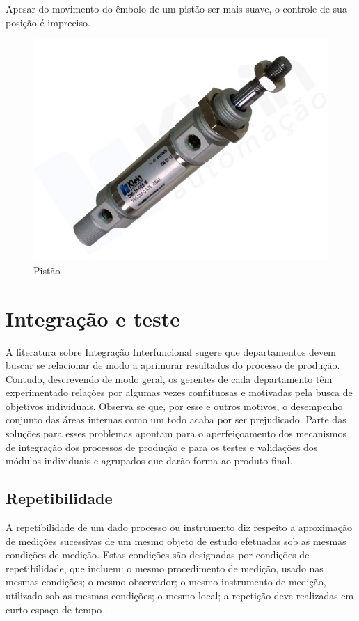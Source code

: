 \begin{anexosenv}
Apesar do movimento do êmbolo de um pistão ser mais suave, o controle de sua posição é impreciso.

\begin{figure}[htb]
		\centering
			\includegraphics[scale=0.6]{figuras/pistao.png}
		\caption{Pistão}
		\label{pistao}
\end{figure}



\section[Integração e teste]{Integração e teste}

A literatura sobre Integração Interfuncional sugere que departamentos devem buscar se relacionar de modo a aprimorar resultados do processo de produção. Contudo, descrevendo de modo geral, os gerentes de cada departamento têm experimentado relações por algumas vezes conflituosas e motivadas pela busca de objetivos individuais. Observa se que,  por esse e outros motivos, o desempenho conjunto das áreas internas como um todo acaba por ser prejudicado. Parte das soluções para esses problemas apontam para o aperfeiçoamento dos mecanismos de integração dos processos de produção e para os testes e validações dos módulos individuais e agrupados que darão forma ao produto final.

\subsection[Repetibilidade]{Repetibilidade}

A repetibilidade de um dado processo ou instrumento diz respeito a aproximação de medições sucessivas de um mesmo objeto de estudo efetuadas sob as mesmas condições de medição. Estas condições são designadas por condições de repetibilidade, que incluem: o mesmo procedimento de medição, usado nas mesmas condições; o mesmo observador; o mesmo instrumento de medição, utilizado sob as mesmas condições; o mesmo local; a repetição deve realizadas em curto espaço de tempo \cite{aurelio}. 


\end{anexosenv}
